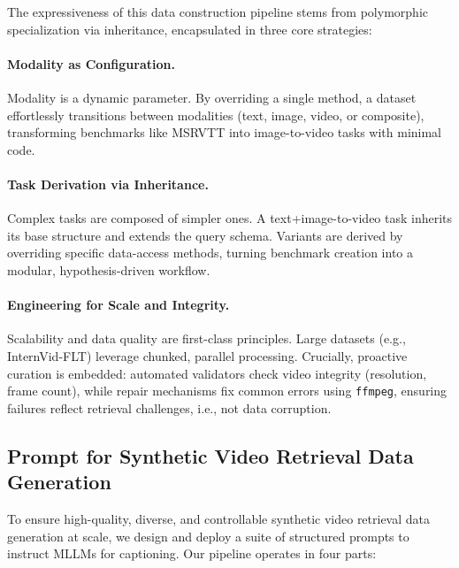The expressiveness of this data construction pipeline stems from polymorphic specialization via inheritance, encapsulated in three core strategies:

\paragraph{Modality as Configuration.}
Modality is a dynamic parameter. By overriding a single method, a dataset effortlessly transitions between modalities (text, image, video, or composite), transforming benchmarks like MSRVTT into image-to-video tasks with minimal code.

\paragraph{Task Derivation via Inheritance.}
Complex tasks are composed of simpler ones. A text+image-to-video task inherits its base structure and extends the query schema. Variants are derived by overriding specific data-access methods, turning benchmark creation into a modular, hypothesis-driven workflow.

\paragraph{Engineering for Scale and Integrity.}
Scalability and data quality are first-class principles. Large datasets (e.g., InternVid-FLT) leverage chunked, parallel processing. Crucially, proactive curation is embedded: automated validators check video integrity (resolution, frame count), while repair mechanisms fix common errors using \texttt{ffmpeg}, ensuring failures reflect retrieval challenges, i.e., not data corruption.









\fi

\iffalse %
\subsection{Prompt for Synthetic Video Retrieval Data Generation}\label{gve:app:prompt}

To ensure high-quality, diverse, and controllable synthetic video retrieval data generation at scale, we design and deploy a suite of structured prompts to instruct MLLMs for captioning. Our pipeline operates in four parts:

